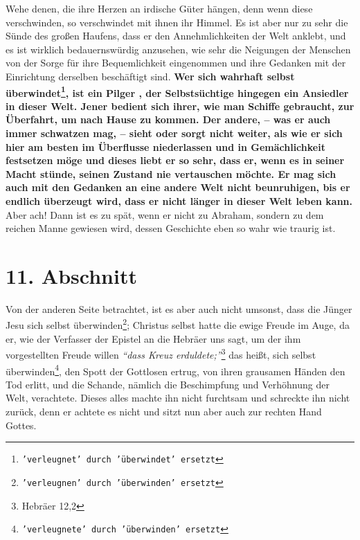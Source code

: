 \label{ref:04_10_pilger}
 Wehe denen, die ihre Herzen an irdische Güter hängen, denn
wenn diese
verschwinden, so verschwindet mit ihnen ihr Himmel.  Es ist
aber nur zu sehr die
Sünde des großen Haufens, dass er den Annehmlichkeiten der Welt anklebt, und es
ist wirklich bedauernswürdig anzusehen, wie sehr die Neigungen der Menschen von
der Sorge für ihre Bequemlichkeit eingenommen und ihre Gedanken mit der
Einrichtung derselben beschäftigt sind. \textbf{Wer sich wahrhaft selbst
überwindet\footnote{\texttt{'verleugnet' durch 'überwindet' ersetzt}}, ist
ein Pilger , der Selbstsüchtige hingegen ein Ansiedler
in dieser
Welt. Jener
bedient sich ihrer, wie man Schiffe gebraucht, zur Überfahrt, um nach Hause zu
kommen. Der andere, -- was er auch immer schwatzen mag, -- sieht oder sorgt
nicht weiter, als wie er sich hier am besten im Überflusse niederlassen und in
Gemächlichkeit festsetzen möge und dieses liebt er so sehr, dass er, wenn es in
seiner Macht stünde, seinen Zustand nie vertauschen möchte. Er mag sich auch mit
den Gedanken an eine andere Welt nicht beunruhigen, bis er endlich überzeugt
wird, dass er nicht länger in dieser Welt leben kann.} Aber ach! Dann ist es zu
spät, wenn er nicht zu Abraham, sondern zu dem reichen Manne gewiesen wird,
dessen Geschichte eben so wahr wie traurig ist.

\section{11. Abschnitt} \label{kap4_ab11}


Von der anderen Seite betrachtet, ist es aber auch nicht umsonst, dass die
Jünger
Jesu sich selbst überwinden\footnote{\texttt{'verleugnen' durch 'überwinden'
ersetzt}}; Christus selbst hatte die ewige Freude im Auge, da er,
wie der Verfasser der Epistel an die Hebräer uns sagt, um der ihm vorgestellten
Freude willen
\textit{"`dass Kreuz erduldete;"'}\footnote{Hebräer 12,2}
das heißt, sich
selbst überwinden\footnote{\texttt{'verleugnete' durch 'überwinden' ersetzt}},
den
Spott der Gottlosen ertrug, von ihren grausamen Händen
den Tod erlitt, und die Schande, nämlich die Beschimpfung und Verhöhnung der
Welt, verachtete. Dieses alles machte ihn nicht furchtsam und schreckte ihn
nicht zurück, denn er achtete es nicht und sitzt nun aber auch zur rechten Hand
Gottes.

\medskip

